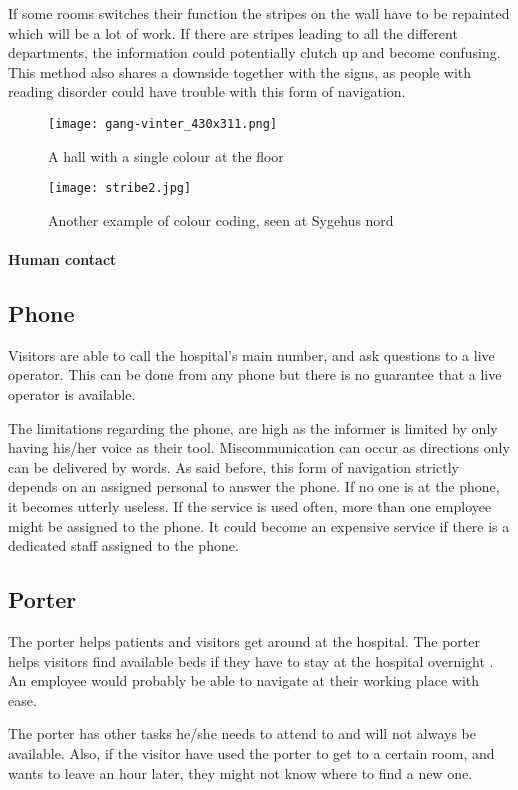 If some rooms switches their function the stripes on the wall have to be repainted which will be a lot of work. If there are stripes leading to all the different departments, the information could potentially clutch up and become confusing. This method also shares a downside together with the signs, as people with reading disorder could have trouble with this form of navigation.
  \begin{figure}[ht!]
  \centering
  \texttt{[image: gang-vinter\_430x311.png]}
  \caption{A hall with a single colour at the floor}
  \label{overflow}
  \end{figure}
    \begin{figure}[ht!]
    \centering
    \texttt{[image: stribe2.jpg]}
    \caption{Another example of colour coding, seen at Sygehus nord}
    \label{overflow}
    \end{figure}
\paragraph{Human contact}
\subsection{Phone}
Visitors are able to call the hospital's main number, and ask questions to a live operator. This can be done from any phone but there is no guarantee that a live operator is available.

The limitations regarding the phone, are high as the informer is limited by only having his/her voice as their tool. Miscommunication can occur as directions only can be delivered by words. As said before, this form of navigation strictly depends on an assigned personal to answer the phone. If no one is at the phone, it becomes utterly useless.
If the service is used often, more than one employee might be assigned to the phone. It could become an expensive service if there is a dedicated staff assigned to the phone. 

\subsection{Porter}
The porter helps patients\cite{porter} and visitors get around at the hospital. The porter helps visitors find available beds if they have to stay at the hospital overnight \cite{ugd_port}. An employee would probably be able to navigate at their working place with ease.

The porter has other tasks he/she needs to attend to and will not always be available. Also, if the visitor have used the porter to get to a certain room, and wants to leave an hour later, they might not know where to find a new one. 


